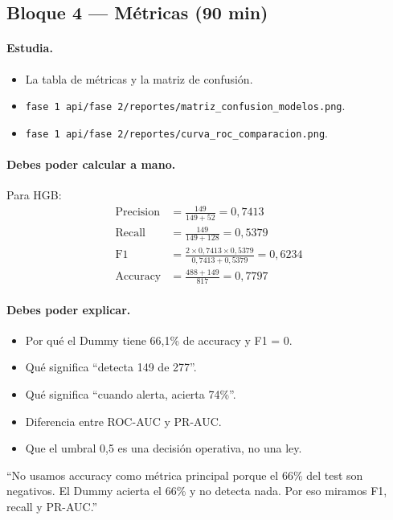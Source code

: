 \documentclass[11pt,a4paper]{article}
\newcommand{\code}[1]{\texttt{#1}}
\begin{document}
\subsection{Bloque 4 --- Métricas (90 min)}

\paragraph{Estudia.}
\begin{itemize}[leftmargin=*]
  \item La tabla de métricas y la matriz de confusión.
  \item \code{fase 1 api/fase 2/reportes/matriz_confusion_modelos.png}.
  \item \code{fase 1 api/fase 2/reportes/curva_roc_comparacion.png}.
\end{itemize}

\paragraph{Debes poder calcular a mano.}
Para HGB:
\begin{align*}
\text{Precision} &= \frac{149}{149 + 52} = 0{,}7413 \\
\text{Recall} &= \frac{149}{149 + 128} = 0{,}5379 \\
\text{F1} &= \frac{2 \times 0{,}7413 \times 0{,}5379}{0{,}7413 + 0{,}5379} = 0{,}6234 \\
\text{Accuracy} &= \frac{488 + 149}{817} = 0{,}7797
\end{align*}

\paragraph{Debes poder explicar.}
\begin{itemize}[leftmargin=*]
  \item Por qué el Dummy tiene 66,1\% de accuracy y F1 = 0.
  \item Qué significa ``detecta 149 de 277''.
  \item Qué significa ``cuando alerta, acierta 74\%''.
  \item Diferencia entre ROC-AUC y PR-AUC.
  \item Que el umbral 0,5 es una decisión operativa, no una ley.
\end{itemize}

\begin{tcolorbox}[frase,title={Frase para el profesor}]
``No usamos accuracy como métrica principal porque el 66\% del test son negativos. El Dummy acierta el 66\% y no detecta nada. Por eso miramos F1, recall y PR-AUC.''
\end{tcolorbox}
\end{document}
